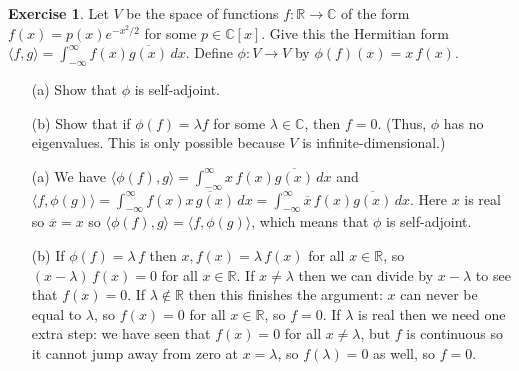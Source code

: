 \documentclass{amsart}
\newcommand{\R}         {{\mathbb{R}}}
\newcommand{\C}         {{\mathbb{C}}}
\newcommand{\lm}        {\lambda}
\newcommand{\ip}[1]     {\langle #1\rangle}
\newcommand{\ov}[1]     {\overline{#1}}
\renewcommand{\:}       {\colon}
\theoremstyle{definition}
\newtheorem{exercise}{Exercise}[section]
\renewenvironment{solution}{\SolutionAtEnd}{\endSolutionAtEnd}
\begin{document}
\begin{exercise}\label{ex-gaussian}
 Let $V$ be the space of functions $f\:\R\to\C$ of the form
 $f(x)=p(x)e^{-x^2/2}$ for some $p\in\C[x]$.  Give this the Hermitian
 form $\ip{f,g}=\int_{-\infty}^\infty f(x)\ov{g(x)}\,dx$.  Define
 $\phi\:V\to V$ by $\phi(f)(x)=x\,f(x)$.
 \begin{itemize}
  \item[(a)] Show that $\phi$ is self-adjoint.
  \item[(b)] Show that if $\phi(f)=\lm f$ for some $\lm\in\C$, then
   $f=0$.  (Thus, $\phi$ has no eigenvalues.  This is only possible
   because $V$ is infinite-dimensional.)
 \end{itemize}
\end{exercise}
\begin{solution}
 \begin{itemize}
  \item[(a)] We have
   $\ip{\phi(f),g}=\int_{-\infty}^\infty x\,f(x)\ov{g(x)}\,dx$ and
   $\ip{f,\phi(g)}=\int_{-\infty}^\infty f(x)\ov{x\,g(x)}\,dx=
   \int_{-\infty}^\infty \ov{x}\,f(x)\ov{g(x)}\,dx$.  Here $x$ is real
   so $\ov{x}=x$ so $\ip{\phi(f),g}=\ip{f,\phi(g)}$, which means that
   $\phi$ is self-adjoint. 
  \item[(b)] If $\phi(f)=\lm\,f$ then $x,f(x)=\lm\,f(x)$ for all
   $x\in\R$, so $(x-\lm)\,f(x)=0$ for all $x\in\R$.  If $x\neq\lm$
   then we can divide by $x-\lm$ to see that $f(x)=0$.  If
   $\lm\not\in\R$ then this finishes the argument: $x$ can never be
   equal to $\lm$, so $f(x)=0$ for all $x\in\R$, so $f=0$.  If $\lm$
   is real then we need one extra step: we have seen that $f(x)=0$ for
   all $x\neq\lm$, but $f$ is continuous so it cannot jump away from
   zero at $x=\lm$, so $f(\lm)=0$ as well, so $f=0$.
 \end{itemize}
\end{solution}
\end{document}
